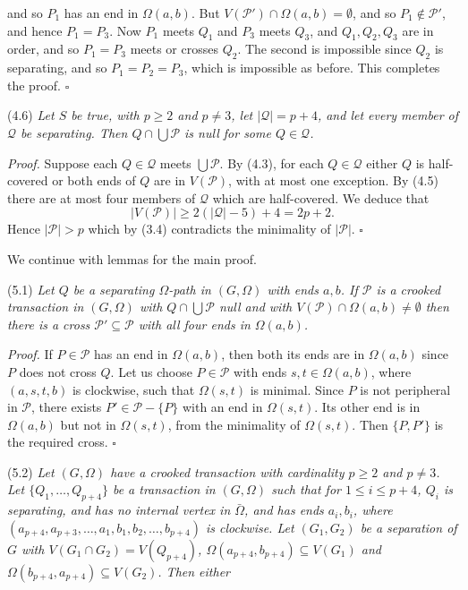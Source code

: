 \noindent and so $P_1$ has an end in $\Omega(a, b)$. But $V(\mathcal{P}') \cap \Omega(a, b) = \emptyset$, and so $P_1 \notin \mathcal{P}'$, and hence $P_1 = P_3$. Now $P_1$ meets $Q_1$ and $P_3$ meets $Q_3$, and $Q_1, Q_2, Q_3$ are in order, and so $P_1 = P_3$ meets or crosses $Q_2$. The second is impossible since $Q_2$ is separating, and so $P_1 = P_2 = P_3$, which is impossible as before. This completes the proof. $\square$

\stmt
(4.6) \textit{Let $S$ be true, with $p \ge 2$ and $p \ne 3$, let $|\mathcal{Q}| = p + 4$, and let every member of $\mathcal{Q}$ be separating. Then $Q \cap \bigcup \mathcal{P}$ is null for some $Q \in \mathcal{Q}$.}

\textit{Proof.} Suppose each $Q \in \mathcal{Q}$ meets $\bigcup \mathcal{P}$. By (4.3), for each $Q \in \mathcal{Q}$ either $Q$ is half-covered or both ends of $Q$ are in $V(\mathcal{P})$, with at most one exception. By (4.5) there are at most four members of $\mathcal{Q}$ which are half-covered. We deduce that
\begin{equation*}
|V(\mathcal{P})| \ge 2(|\mathcal{Q}| - 5) + 4 = 2p + 2.
\end{equation*}
Hence $|\mathcal{P}| > p$ which by (3.4) contradicts the minimality of $|\mathcal{P}|$. $\square$


We continue with lemmas for the main proof.

\stmt
(5.1) \textit{Let $Q$ be a separating $\Omega$-path in $(G, \Omega)$ with ends $a, b$. If $\mathcal{P}$ is a crooked transaction in $(G, \Omega)$ with $Q \cap \bigcup \mathcal{P}$ null and with $V(\mathcal{P}) \cap \Omega(a, b) \ne \emptyset$ then there is a cross $\mathcal{P}' \subseteq \mathcal{P}$ with all four ends in $\Omega(a, b)$.}

\textit{Proof.} If $P \in \mathcal{P}$ has an end in $\Omega(a, b)$, then both its ends are in $\Omega(a, b)$ since $P$ does not cross $Q$. Let us choose $P \in \mathcal{P}$ with ends $s, t \in \Omega(a, b)$, where $(a, s, t, b)$ is clockwise, such that $\Omega(s, t)$ is minimal. Since $P$ is not peripheral in $\mathcal{P}$, there exists $P' \in \mathcal{P} - \{P\}$ with an end in $\Omega(s, t)$. Its other end is in $\Omega(a, b)$ but not in $\Omega(s, t)$, from the minimality of $\Omega(s, t)$. Then $\{P, P'\}$ is the required cross. $\square$

\stmt
(5.2) \textit{Let $(G, \Omega)$ have a crooked transaction with cardinality $p \ge 2$ and $p \ne 3$. Let $\{Q_1, \dots, Q_{p+4}\}$ be a transaction in $(G, \Omega)$ such that for $1 \le i \le p+4$, $Q_i$ is separating, and has no internal vertex in $\bar{\Omega}$, and has ends $a_i, b_i$, where $(a_{p+4}, a_{p+3}, \dots, a_1, b_1, b_2, \dots, b_{p+4})$ is clockwise. Let $(G_1, G_2)$ be a separation of $G$ with $V(G_1 \cap G_2) = V(Q_{p+4})$, $\Omega(a_{p+4}, b_{p+4}) \subseteq V(G_1)$ and $\Omega(b_{p+4}, a_{p+4}) \subseteq V(G_2)$. Then either}

